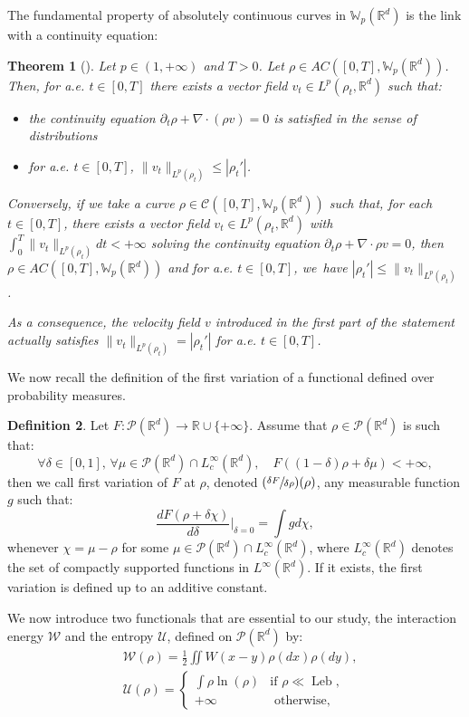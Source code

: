 \documentclass[11pt]{article}
\numberwithin{equation}{section}
\newcommand{\Psfrac}[2]{(\sfrac{#1}{#2})}
\DeclareMathOperator{\Leb}{Leb}
\def\RR{\mathbb{R}}
\def\WW{\mathbb{W}}
\def\pa{\partial}
\def\calC{{\mathcal C}}
\def\calP{{\mathcal P}}
\def\calU{{\mathcal U}}
\def\calW{{\mathcal W}}
\theoremstyle{plain}
\newtheorem{theorem}{Theorem}[section]
\theoremstyle{definition}
\newtheorem{defi}[theorem]{Definition}
\begin{document}
The fundamental property of absolutely continuous curves in $\WW_p(\RR^d)$ is the link with a continuity equation:
\begin{theorem}[{\cite[Th.\,8.3.1]{ambrosio08}}]\label{thm:ACcurves}
Let $p \!\in\! (1,+\infty)$ and $T\!>\!0$.
Let $\rho \!\in\! AC([0,T], \WW_p(\RR^d))$. Then, for a.e. $t \in [0,T]$ there exists a vector field $v_t \in L^p(\rho_t, \RR^d)$ such that:
\begin{itemize}
\item the continuity equation $\pa_t \rho + \nabla \cdot (\rho v) = 0$ is satisfied in the sense of distributions
\item for a.e. $t \in [0,T]$, $\|v_t\|_{L^p(\rho_t)} \leq |\rho_t'|$.
\end{itemize}
Conversely, if we take a curve $\rho \in \calC([0,T], \WW_p(\RR^d))$ such that, for each $t \in [0,T]$, there exists a vector field $v_t \in L^p(\rho_t, \RR^d)$ with $\int_0^T \|v_t\|_{L^p(\rho_t)} dt < +\infty $ solving the continuity equation $\pa_t \rho + \nabla \cdot \rho v = 0$, then $\rho \in AC([0,T], \WW_p(\RR^d))$ and for a.e. $t \in [0,T]$, we~have $|\rho_t'| \leq \|v_t\|_{L^p(\rho_t)}$.

As a consequence, the velocity field $v$ introduced in the first part of the statement actually satisfies $\|v_t\|_{L^p(\rho_t)} = |\rho_t'|$ for a.e. $t \in [0,T]$.
\end{theorem}
We now recall the definition of the first variation of a functional defined over probability measures.
\begin{defi}
Let $F : \calP(\RR^d) \longrightarrow \RR \cup \{+\infty\}$. Assume that $\rho \in \calP(\RR^d)$ is such that:
\[
\forall \delta \in [0,1], \, \forall \mu \in \calP(\RR^d) \cap L_c^\infty(\RR^d), \quad F((1-\delta) \rho + \delta \mu) < +\infty,
\]
then we call first variation of $F$ at $\rho$, denoted $\Psfrac{\delta F}{\delta \rho}(\rho)$, any measurable function $g$ such that:
\[
\frac{d F(\rho + \delta \chi)}{d \delta}\Big|_{\delta = 0} = \int g d\chi,
\]
whenever $\chi = \mu - \rho$ for some $\mu \in \calP(\RR^d) \cap L_c^\infty(\RR^d)$, where $L_c^\infty(\RR^d)$ denotes the set of compactly supported functions in $L^\infty(\RR^d)$. If it exists, the first variation is defined up to an additive constant.
\end{defi}
We now introduce two functionals that are essential to our study, the interaction energy $\calW$ and the entropy $\calU$, defined on $\calP(\RR^d)$ by:
\begin{align*}
& \calW(\rho) = \frac 12 \iint W(x-y) \rho(dx) \rho(dy), \\
& \calU(\rho) = \begin{cases}
\int \rho \ln(\rho) & \text{if } \rho \ll \Leb, \\
+\infty & \text{ otherwise,}
\end{cases}
\end{align*}
\end{document}
